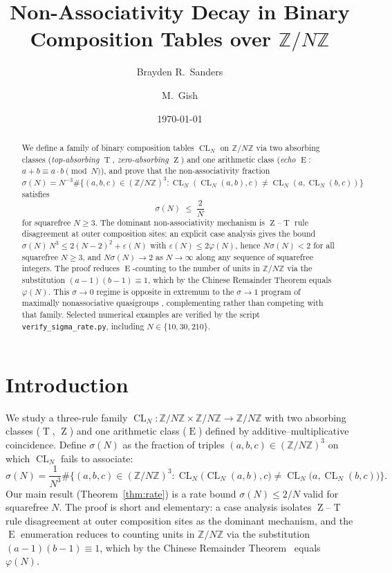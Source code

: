 \documentclass[11pt,reqno]{amsart}
\title[Non-associativity decay on \texorpdfstring{$\mathbb{Z}/N\mathbb{Z}$}{Z/NZ}]%
{Non-Associativity Decay in Binary Composition Tables over
$\mathbb{Z}/N\mathbb{Z}$}
\author{Brayden R.\ Sanders}
\author{M.\ Gish}
\date{\today}
\theoremstyle{plain}
\theoremstyle{definition}
\theoremstyle{remark}
\DeclareMathOperator{\CL}{CL}
\DeclareMathOperator{\ECHO}{E}
\DeclareMathOperator{\HARM}{T}
\DeclareMathOperator{\VOID}{Z}
\newcommand{\ZN}{\mathbb{Z}/N\mathbb{Z}}
\begin{document}
\begin{abstract}
We define a family of binary composition tables $\CL_N$ on $\ZN$ via
two absorbing classes (\emph{top-absorbing} $\HARM$, \emph{zero-absorbing}
$\VOID$) and one arithmetic class (\emph{echo} $\ECHO$: $a+b\equiv a\cdot b\pmod N$),
and prove that the non-associativity fraction
$\sigma(N)=N^{-3}\#\{(a,b,c)\in(\ZN)^{3}:\CL_N(\CL_N(a,b),c)\neq\CL_N(a,\CL_N(b,c))\}$
satisfies
\[
  \sigma(N)\;\le\;\frac{2}{N}
\]
for squarefree $N\ge 3$. The dominant non-associativity mechanism is
$\VOID$--$\HARM$ rule disagreement at outer composition sites; an
explicit case analysis gives the bound
$\sigma(N)\,N^{3}\le 2(N-2)^{2}+\varepsilon(N)$ with
$\varepsilon(N)\le 2\varphi(N)$, hence $N\sigma(N)<2$ for all
squarefree $N\ge 3$, and $N\sigma(N)\to 2$ as $N\to\infty$ along
any sequence of squarefree integers. The proof reduces $\ECHO$-counting to
the number of units in $\ZN$ via the substitution
$(a-1)(b-1)\equiv 1$, which by the Chinese Remainder Theorem equals
$\varphi(N)$. This $\sigma\to 0$ regime is opposite in extremum to
the $\sigma\to 1$ program of maximally nonassociative quasigroups
\cite{DrapalWanless2021a,DrapalWanless2021b,DrapalLisonek2020}, complementing rather than
competing with that family. Selected numerical examples
are verified by the script \texttt{verify\_sigma\_rate.py}, including
$N\in\{10,30,210\}$.
\end{abstract}

\maketitle

\section{Introduction}\label{sec:intro}

We study a three-rule family $\CL_N:\ZN\times\ZN\to\ZN$ with two
absorbing classes ($\HARM$, $\VOID$) and one arithmetic class
($\ECHO$) defined by additive--multiplicative coincidence. Define
$\sigma(N)$ as the fraction of triples $(a,b,c)\in(\ZN)^3$ on which
$\CL_N$ fails to associate:
\begin{equation}\label{eq:sigma-def}
  \sigma(N)=\frac{1}{N^{3}}
  \#\Big\{(a,b,c)\in(\ZN)^{3}:
         \CL_N\!\big(\CL_N(a,b),c\big)\neq\CL_N\!\big(a,\CL_N(b,c)\big)\Big\}.
\end{equation}
Our main result (Theorem~\ref{thm:rate}) is a rate bound
$\sigma(N)\le 2/N$ valid for squarefree $N$. The proof is short
and elementary: a case analysis isolates $\VOID$--$\HARM$ rule
disagreement at outer composition sites as the dominant mechanism,
and the $\ECHO$ enumeration reduces to counting units in $\ZN$
via the substitution $(a-1)(b-1)\equiv 1$, which by the Chinese
Remainder Theorem~\cite{Gauss1801,Lang2002} equals $\varphi(N)$.
\end{document}
